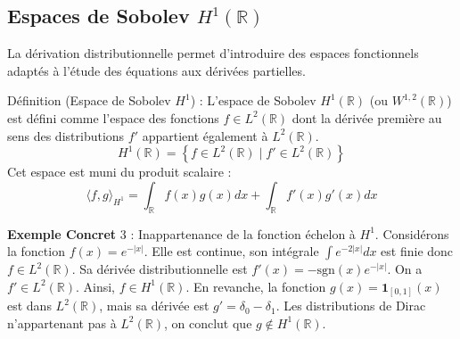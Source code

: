 \documentclass[11pt,a4paper]{article}
\begin{document}
\begin{center}
\end{center}


\subsection{Espaces de Sobolev  $H^1(\mathbb{R})$}

La dérivation distributionnelle permet d'introduire des espaces fonctionnels adaptés à l'étude des équations aux dérivées partielles.

Définition (Espace de Sobolev $H^1$) :
L'espace de Sobolev $H^1(\mathbb{R})$ (ou $W^{1,2}(\mathbb{R})$) est défini comme l'espace des fonctions $f \in L^2(\mathbb{R})$ dont la dérivée première au sens des distributions $f'$ appartient également à $L^2(\mathbb{R})$.
$$ H^1(\mathbb{R}) = \left\{ f \in L^2(\mathbb{R}) \mid f' \in L^2(\mathbb{R}) \right\} $$
Cet espace est muni du produit scalaire :
$$ \langle f, g \rangle_{H^1} = \int_{\mathbb{R}} f(x)g(x) dx + \int_{\mathbb{R}} f'(x)g'(x) dx $$

\textbf{Exemple Concret} 3 : Inappartenance de la fonction échelon à $H^1$.
Considérons la fonction $f(x) = e^{-|x|}$.
Elle est continue, son intégrale $\int e^{-2|x|}dx$ est finie donc $f \in L^2(\mathbb{R})$.
Sa dérivée distributionnelle est $f'(x) = -\text{sgn}(x)e^{-|x|}$. On a $f' \in L^2(\mathbb{R})$. Ainsi, $f \in H^1(\mathbb{R})$.
En revanche, la fonction $g(x) = \mathbf{1}_{[0,1]}(x)$ est dans $L^2(\mathbb{R})$, mais sa dérivée est $g' = \delta_0 - \delta_1$. Les distributions de Dirac n'appartenant pas à $L^2(\mathbb{R})$, on conclut que $g \notin H^1(\mathbb{R})$.
\end{document}
